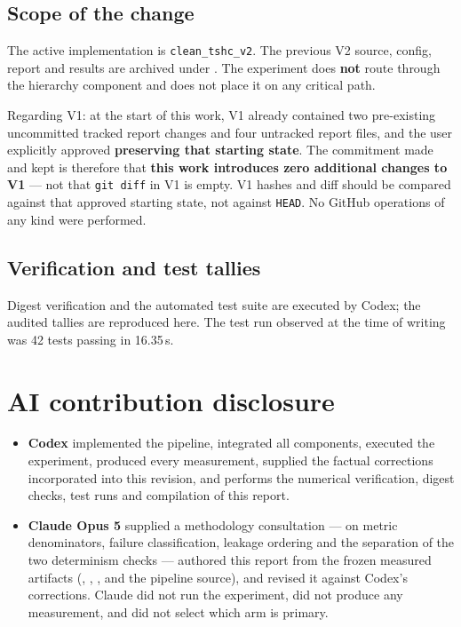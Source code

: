 \documentclass[11pt,a4paper]{article}
\begin{document}
\subsection{Scope of the change}

The active implementation is \texttt{clean\_tshc\_v2}. The previous V2 source, config, report and results are
archived under . The experiment does \textbf{not} route through the hierarchy
component and does not place it on any critical path.

Regarding V1: at the start of this work, V1 already contained two pre-existing uncommitted tracked report
changes and four untracked report files, and the user explicitly approved \textbf{preserving that starting
state}. The commitment made and kept is therefore that \textbf{this work introduces zero additional changes
to V1} --- not that \texttt{git diff} in V1 is empty. V1 hashes and diff should be compared against that
approved starting state, not against \texttt{HEAD}. No GitHub operations of any kind were performed.

\subsection{Verification and test tallies}

Digest verification and the automated test suite are executed by Codex; the audited tallies are reproduced
here. The test run observed at the time of writing was 42 tests passing in 16.35\,s.


\section{AI contribution disclosure}

\begin{itemize}
\item \textbf{Codex} implemented the pipeline, integrated all components, executed the experiment, produced
every measurement, supplied the factual corrections incorporated into this revision, and performs the
numerical verification, digest checks, test runs and compilation of this report.
\item \textbf{Claude Opus 5} supplied a methodology consultation --- on metric denominators, failure
classification, leakage ordering and the separation of the two determinism checks --- authored this report
from the frozen measured artifacts (,
, ,
 and the pipeline source), and revised it against Codex's
corrections. Claude did not run the experiment, did not produce any measurement, and did not select which
arm is primary.
\end{itemize}
\end{document}
